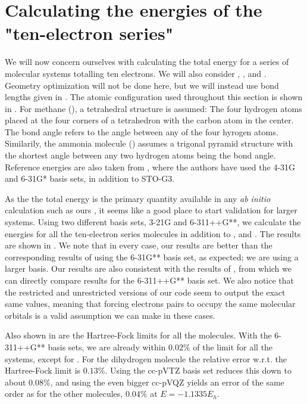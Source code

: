 \documentclass[../../master.tex]{subfiles}
\begin{document}
\section{Calculating the energies of the "ten-electron series"}
We will now concern ourselves with calculating the total energy for a series of molecular systems totalling ten electrons. We will also consider , , and . Geometry optimization will not be done here, but we will instead use bond lengths given in \cite{szabo}. The atomic configuration used throughout this section is shown in . For methane (), a tetrahedral structure is assumed: The four hydrogen atoms placed at the four corners of a tetrahedron with the carbon atom in the center. The bond angle refers to the \textemdash{}\textemdash{} angle between any of the four hyrogen atoms. Similarily, the ammonia molecule () assumes a trigonal pyramid structure with the shortest \textemdash{}\textemdash{} angle between any two hydrogen atoms being the bond angle. Reference energies are also taken from \cite{szabo}, where the authors have used the 4-31G and 6-31G* basis sets, in addition to STO-G3. 

As the the total energy is the primary quantity available in any \emph{ab initio} calculation such as ours \cite{szabo}, it seems like a good place to start validation for larger systems. Using two different basis sets, 3-21G and 6-311++G**, we calculate the energies for all the ten-electron series molecules in addition to ,  and . The results are shown in . We note that in every case, our results are better than the corresponding results of \cite{szabo} using the 6-31G** basis set, as expected; we are using a larger basis. Our results are also consistent with the results of \cite{dragly}, from which we can directly compare results for the 6-311++G** basis set. We also notice that the restricted and unrestricted versions of our code seem to output the exact same values, meaning that forcing electrons pairs to occupy the same molecular orbitals is a valid assumption we can make in these cases.

Also shown in  are the Hartree-Fock limits for all the molecules. With the 6-311++G** basis sets, we are already within $0.02\%$ of the limit for all the systems, except for . For the dihydrogen molecule the relative error w.r.t. the Hartree-Fock limit is $0.13\%$. Using the cc-pVTZ basis set reduces this down to about $0.08\%$, and using the even bigger cc-pVQZ yields an error of the same order as for the other molecules, $0.04\%$ at $E=-1.1335E_h$.
\end{document}
